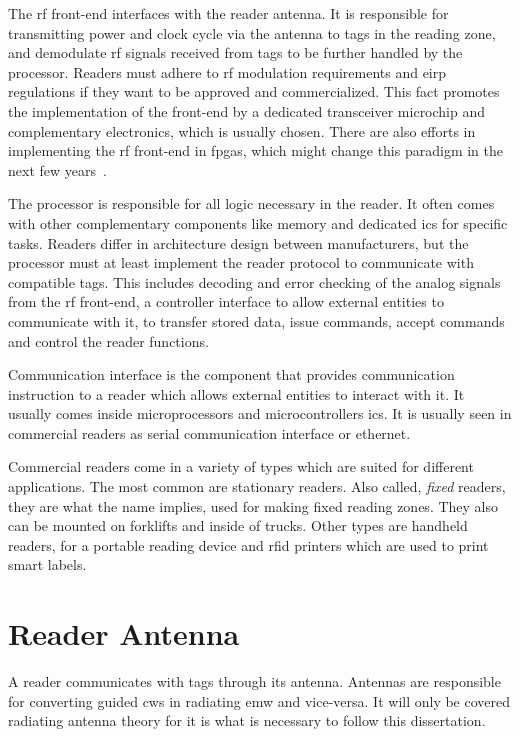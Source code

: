 The \ac{rf} front-end interfaces with the reader antenna. 
It is responsible for transmitting power and clock cycle via the antenna to tags in the reading zone, and demodulate \ac{rf} signals received from tags to be further handled by the processor. 
Readers must adhere to \ac{rf} modulation requirements and \ac{eirp} regulations if they want to be approved and commercialized. This fact promotes the implementation of the front-end by a dedicated transceiver microchip and complementary electronics, which is usually chosen. There are also efforts in implementing the \ac{rf} front-end in \acp{fpga}, which might change this paradigm in the next few years~\cite{hugomanueloliveirademirandaSistemasRFIDUHF2015}.

The processor is responsible for all logic necessary in the reader. It often comes with other complementary components like memory and dedicated \acp{ic} for specific tasks. Readers differ in architecture design between manufacturers, but the processor must at least implement the reader protocol to communicate with compatible tags. This includes decoding and error checking of the analog signals from the \ac{rf} front-end, a controller interface to allow external entities to communicate with it, to transfer stored data, issue commands, accept commands and control the reader functions.

Communication interface is the component that provides communication instruction to a reader which allows external entities to interact with it.
It usually comes inside microprocessors and microcontrollers \acp{ic}. It is usually seen in commercial readers as serial communication interface or ethernet.

Commercial readers come in a variety of types which are suited for different applications.
The most common are stationary readers. Also called, \emph{fixed} readers, they are what the name implies, used for making fixed reading zones. They also can be mounted on forklifts and inside of trucks.
Other types are handheld readers, for a portable reading device and \ac{rfid} printers which are used to print smart labels.

\section{Reader Antenna} \label{sec:antenna}

A reader communicates with tags through its antenna. 
Antennas are responsible for converting guided \acp{cw} in radiating \ac{emw} and vice-versa.
It will only be covered radiating antenna theory for it is what is necessary to follow this dissertation.

